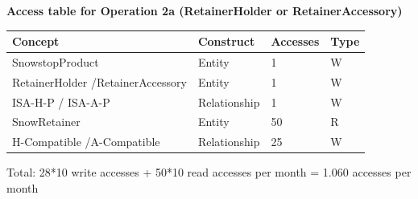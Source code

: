 \documentclass{article}[h]
\begin{document}
\vspace{12px}

{\centering \textbf{Access table for Operation 2a (RetainerHolder or RetainerAccessory)}\\}
\begin{table}[H]
  \def\arraystretch{1.10}%
  \centering
  \begin{tabular}{ | m{4cm} | m{4cm}| m{3cm} | m{2cm} |} 
    \hline
    {\textbf{\large Concept}} & {\textbf{\large Construct}} & {\textbf{\large Accesses}} & {\textbf{\large Type}} \\
    \hline
    \color[HTML]{3531FF} SnowstopProduct & Entity & 1 & W \\ 
    \hline
    \color[HTML]{3531FF} RetainerHolder /\newline RetainerAccessory & Entity & 1 & W \\ 
    \hline
    \color[HTML]{3531FF} ISA-H-P / ISA-A-P & Relationship & 1 & W \\ 
    \hline
    \color[HTML]{3531FF} SnowRetainer & Entity & 50 & R \\ 
    \hline
    \color[HTML]{3531FF} H-Compatible /\newline A-Compatible & Relationship & 25 & W \\ 
    \hline
  \end{tabular}
\end{table}
Total: 28*10 write accesses + 50*10 read accesses per month = 1.060 accesses per month

\vspace{12px}
\end{document}
